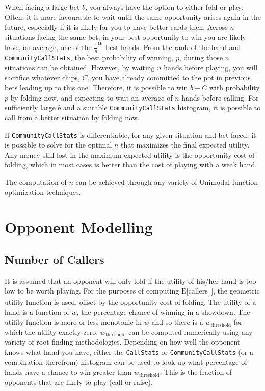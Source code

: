 When facing a large bet $b$, you always have the option to either fold or play.
Often, it is more favourable to wait until the same opportunity arises again in the future, especially if it is likely for you to have better cards then.
Across $n$ situations facing the same bet, in your best opportunity to win you are likely have, on average, one of the $\frac{1}{n}^\mathrm{th}$ best hands.
From the rank of the hand and \texttt{CommunityCallStats}, the best probability of winning, $p$, during those $n$ situations can be obtained.
However, by waiting $n$ hands before playing, you will sacrifice whatever chips, $C$, you have already committed to the pot in previous bets leading up to this one.
Therefore, it is possible to win $b-C$ with probability $p$ by folding now, and expecting to wait an average of $n$ hands before calling.
For sufficiently large $b$ and a suitable \texttt{CommunityCallStats} histogram, it is possible to call from a better situation by folding now.

If \texttt{CommunityCallStats} is differentiable, for any given situation and bet faced, it is possible to solve for the optimal $n$ that maximizes the final expected utility.
Any money still lost in the maximum expected utility is the opportunity cost of folding, which in most cases is better than the cost of playing with a weak hand.

The computation of $n$ can be achieved through any variety of Unimodal function optimization techniques.

\section{Opponent Modelling}

\subsection{Number of Callers}
\label{sec:Callers}
It is assumed that an opponent will only fold if the utility of his/her hand is too low to be worth playing.
For the purposes of computing $\mathrm{E[callers}_x]$, the geometric utility function is used, offset by the opportunity cost of folding.
The utility of a hand is a function of $w$, the percentage chance of winning in a showdown.
The utility function is more or less monotonic in $w$ and so there is a $w_\mathrm{threshold}$ for which the utility exactly zero.
$w_\mathrm{threshold}$ can be computed numerically using any variety of root-finding methodologies.
Depending on how well the opponent knows what hand you have, either the \texttt{CallStats} or \texttt{CommunityCallStats} (or a combination therefrom) histogram can be used to look up what percentage of hands have a chance to win greater than $w_\mathrm{threshold}$.
This is the fraction of opponents that are likely to play (call or raise).


